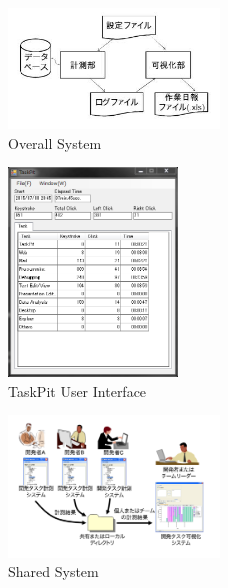 \documentclass [paper]{ieice}
\begin{document}
\begin{figure}[h]
	\centering	
\includegraphics[width=0.5\textwidth]{fig4}
	\caption{Overall System}
	\label{fig4}
\end{figure}

\begin{figure}[h]
	\centering	
\includegraphics[width=0.4\textwidth]{fig5}
	\caption{TaskPit User Interface}
	\label{fig5}
\end{figure}

\begin{figure}[h]
	\centering	
\includegraphics[width=0.5\textwidth]{fig6}
	\caption{Shared System}
	\label{fig6}
\end{figure}
	
\end{document}
